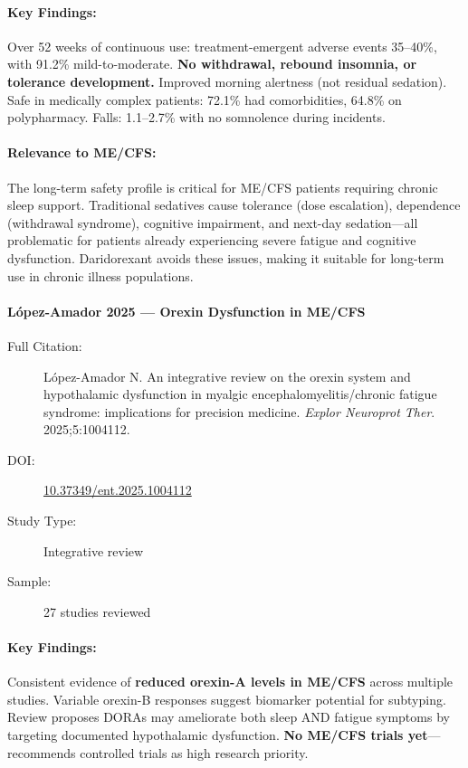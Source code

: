 \paragraph{Key Findings:}
Over 52 weeks of continuous use: treatment-emergent adverse events 35--40\%, with 91.2\% mild-to-moderate. \textbf{No withdrawal, rebound insomnia, or tolerance development.} Improved morning alertness (not residual sedation). Safe in medically complex patients: 72.1\% had comorbidities, 64.8\% on polypharmacy. Falls: 1.1--2.7\% with no somnolence during incidents.

\paragraph{Relevance to ME/CFS:}
The long-term safety profile is critical for ME/CFS patients requiring chronic sleep support. Traditional sedatives cause tolerance (dose escalation), dependence (withdrawal syndrome), cognitive impairment, and next-day sedation---all problematic for patients already experiencing severe fatigue and cognitive dysfunction. Daridorexant avoids these issues, making it suitable for long-term use in chronic illness populations.

\paragraph{López-Amador 2025 --- Orexin Dysfunction in ME/CFS}

\begin{description}
    \item[Full Citation:] López-Amador N. An integrative review on the orexin system and hypothalamic dysfunction in myalgic encephalomyelitis/chronic fatigue syndrome: implications for precision medicine. \textit{Explor Neuroprot Ther}. 2025;5:1004112.
    \item[DOI:] \href{https://doi.org/10.37349/ent.2025.1004112}{10.37349/ent.2025.1004112}
    \item[Study Type:] Integrative review
    \item[Sample:] 27 studies reviewed
\end{description}

\paragraph{Key Findings:}
Consistent evidence of \textbf{reduced orexin-A levels in ME/CFS} across multiple studies. Variable orexin-B responses suggest biomarker potential for subtyping. Review proposes DORAs may ameliorate both sleep AND fatigue symptoms by targeting documented hypothalamic dysfunction. \textbf{No ME/CFS trials yet}---recommends controlled trials as high research priority.

